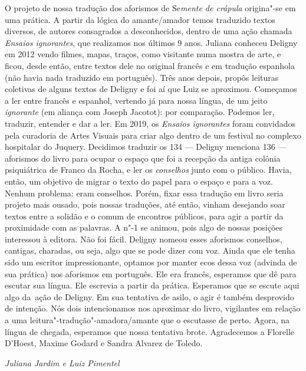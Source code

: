 O projeto de nossa tradução dos aforismos de Se\emph{mente de crápula}
origina"-se em uma prática. A partir da lógica do amante/amador temos
traduzido textos diversos, de autores consagrados a desconhecidos,
dentro de uma ação chamada \emph{Ensaios ignorantes}, que realizamos nos
últimos 9 anos. Juliana conheceu Deligny em 2012 vendo filmes, mapas,
traços, como visitante numa mostra de arte, e ficou, desde então, entre
textos dele no original francês e em tradução espanhola (não havia nada
traduzido em português). Três anos depois, propôs leituras coletivas de
alguns textos de Deligny e foi aí que Luiz se aproximou. Começamos a ler
entre francês e espanhol, vertendo já para nossa língua, de um jeito
\emph{ignorante} (em aliança com Joseph Jacotot): por comparação.
Podemos ler, traduzir, entender e dar a ler. Em 2019, os \emph{Ensaios
ignorantes} foram convidados pela curadoria de Artes Visuais para criar
algo dentro de um festival no complexo hospitalar do Juquery. Decidimos
traduzir os 134 --- Deligny menciona 136 --- aforismos do livro para ocupar o espaço que foi a
recepção da antiga colônia psiquiátrica de Franco da Rocha, e ler os
\emph{conselhos} junto com o público. Havia, então, um objetivo de
migrar o texto do papel para o espaço e para a voz. Nenhum problema:
eram conselhos. Porém, fixar essa tradução em livro seria projeto mais
ousado, pois nossas traduções, até então, vinham desejando soar textos
entre a solidão e o comum de encontros públicos, para agir a partir da
proximidade com as palavras. A n"-1 se animou, pois algo de nossas
posições interessou à editora. Não foi fácil. Deligny nomeou esses
aforismos conselhos, cantigas, charadas, ou seja, algo que se pode dizer
com voz. Ainda que ele tenha sido um escritor impressionante, optamos
por manter ecos dessa voz (advinda de sua prática) nos aforismos em
português. Ele era francês, esperamos que dê para escutar sua língua.
Ele escrevia a partir da prática. Esperamos que se escute aqui algo
da~ação de Deligny. Em sua tentativa de asilo, o agir é também
desprovido de intenção. Nós dois intencionamos nos aproximar do livro,
vigilantes em relação a uma leitura"-tradução"-amadora/amante que o
escutasse de perto. Agora, na língua de chegada, esperamos que nossa
tentativa brote. Agradecemos a Florelle D'Hoest, Maxime Godard e Sandra
Alvarez de Toledo.

\hfill{}\emph{Juliana Jardim e Luiz Pimentel}
